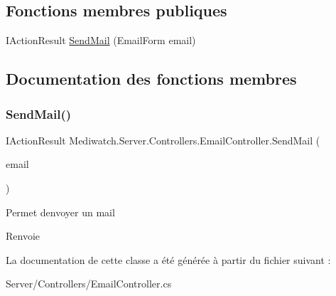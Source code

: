 \subsection*{Fonctions membres publiques}
\begin{DoxyCompactItemize}
\item 
I\+Action\+Result \hyperlink{class_mediwatch_1_1_server_1_1_controllers_1_1_email_controller_a2b9bb204a398a673c010f2ac6f3bb19a}{Send\+Mail} (Email\+Form email)
\end{DoxyCompactItemize}


\subsection{Documentation des fonctions membres}
\mbox{\label{class_mediwatch_1_1_server_1_1_controllers_1_1_email_controller_a2b9bb204a398a673c010f2ac6f3bb19a}} 
\subsubsection{\texorpdfstring{Send\+Mail()}{SendMail()}}
{\footnotesize\ttfamily I\+Action\+Result Mediwatch.\+Server.\+Controllers.\+Email\+Controller.\+Send\+Mail (\begin{DoxyParamCaption}\item[{Email\+Form}]{email }\end{DoxyParamCaption})\hspace{0.3cm}{\ttfamily [inline]}}

Permet d\textquotesingle{}envoyer un mail 

\begin{DoxyReturn}{Renvoie}

\end{DoxyReturn}


La documentation de cette classe a été générée à partir du fichier suivant \+:\begin{DoxyCompactItemize}
\item 
Server/\+Controllers/Email\+Controller.\+cs\end{DoxyCompactItemize}
